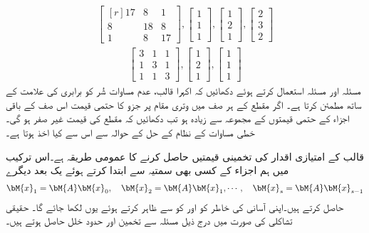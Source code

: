\quad
\begin{align*}
\begin{bmatrix*}[r]17&8&1\\ 8&18&8\\1&8&17\end{bmatrix*}, \begin{bmatrix}1\\1\\1  \end{bmatrix}, \begin{bmatrix}1\\2\\1  \end{bmatrix},
\begin{bmatrix}2\\3\\2  \end{bmatrix}
\end{align*}
\begin{align*}
\begin{bmatrix} 3&1&1\\1&3&1\\1&1&3 \end{bmatrix},\begin{bmatrix}1\\2\\1  \end{bmatrix},\begin{bmatrix}1\\1\\1  \end{bmatrix}
\end{align*}
\quad
مسئلہ  اور مسئلہ  استعمال کرتے ہوئے دکھائیں کہ اکہرا قالب،  عدم مساوات شُر کو برابری کی علامت کے ساتھ مطمئن کرتا ہے۔ 
\quad {} \quad
اگر مقطع کے ہر صف میں وتری مقام پر جزو کا حتمی قیمت اس صف کے باقی اجزاء کے حتمی قیمتوں کے مجموعہ سے زیادہ ہو تب دکھائیں کہ مقطع کی قیمت غیر صفر ہو گی۔خطی مساوات کے نظام کے حل کے حوالہ سے اس سے کیا اخذ ہوتا  ہے۔


 قالب  کے امتیازی اقدار کی تخمینی قیمتیں حاصل کرنے کا عمومی طریقہ  ہے۔اس ترکیب میں ہم   اجزاء کے کسی بھی سمتیہ  سے ابتدا کرتے ہوئے  یک بعد دیگرے
\begin{align*}
\bM{x}_1=\bM{A}\bM{x}_0,\quad \bM{x}_2=\bM{A}\bM{x}_1,\cdots,\quad \bM{x}_s=\bM{A}\bM{x}_{s-1}
\end{align*}
حاصل کرتے ہیں۔اپنی آسانی کی خاطر   کو  اور  کو  سے ظاہر کرتے ہوئے یوں  لکھا جائے گا۔ حقیقی تشاکلی  کی صورت میں درج ذیل مسئلہ سے تخمین اور حدود خلل حاصل ہوتے ہیں۔

